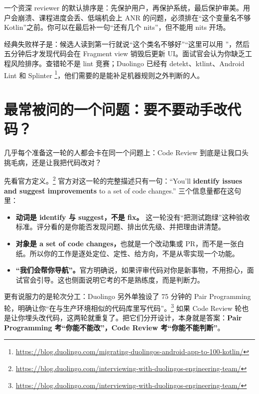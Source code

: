 \begin{idea}
一个资深 reviewer 的默认排序是：先保护用户，再保护系统，最后保护审美。用户会崩溃、课程进度会丢、低端机会上 ANR 的问题，必须排在“这个变量名不够 Kotlin”之前。你可以在最后补一句“还有几个 nits”，但不能用 nits 开场。
\end{idea}

\begin{pitfall}[以风格问题开场]
经典失败样子是：候选人读到第一行就说“这个类名不够好”“这里可以用 ”，然后五分钟后才发现代码会在 Fragment view 销毁后更新 UI。面试官会认为你缺乏工程风险排序。查错轮不是 lint 竞赛；Duolingo 已经有 detekt、ktlint、Android Lint 和 Splinter \srcofficial\footnote{\url{https://blog.duolingo.com/migrating-duolingos-android-app-to-100-kotlin/}}，他们需要的是能补足机器规则之外判断的人。
\end{pitfall}

\section{最常被问的一个问题：要不要动手改代码？}

几乎每个准备这一轮的人都会卡在同一个问题上：Code Review 到底是让我口头挑毛病，还是让我把代码改对？

先看官方定义。\srcofficial\footnote{\url{https://blog.duolingo.com/interviewing-with-duolingos-engineering-team/}} 官方对这一轮的完整描述只有一句：“You'll \textbf{identify issues and suggest improvements} to a set of code changes.” 三个信息量都在这句里：

\begin{itemize}
  \item \textbf{动词是 identify 与 suggest，不是 fix。} 这一轮没有“把测试跑绿”这种验收标准。评分看的是你能否发现问题、排出优先级、并把理由讲清楚。
  \item \textbf{对象是 a set of code changes，}也就是一个改动集或 PR，而不是一张白纸。所以你的工作是逐处定位、定性、给方向，不是从零实现一个功能。
  \item \textbf{“我们会帮你导航”。}官方明确说，如果评审代码对你是新事物，不用担心，面试官会引导。这也侧面说明它考的不是熟练度，而是判断力。
\end{itemize}

更有说服力的是轮次分工：Duolingo 另外单独设了 75 分钟的 Pair Programming 轮，明确让你“在与生产环境相似的代码库里写代码”。\srcofficial\footnote{\url{https://blog.duolingo.com/interviewing-with-duolingos-engineering-team/}} 如果 Code Review 轮也是让你埋头改代码，这两轮就重复了。把它们分开设计，本身就是答案：\textbf{Pair Programming 考“你能不能改”，Code Review 考“你能不能判断”}。

